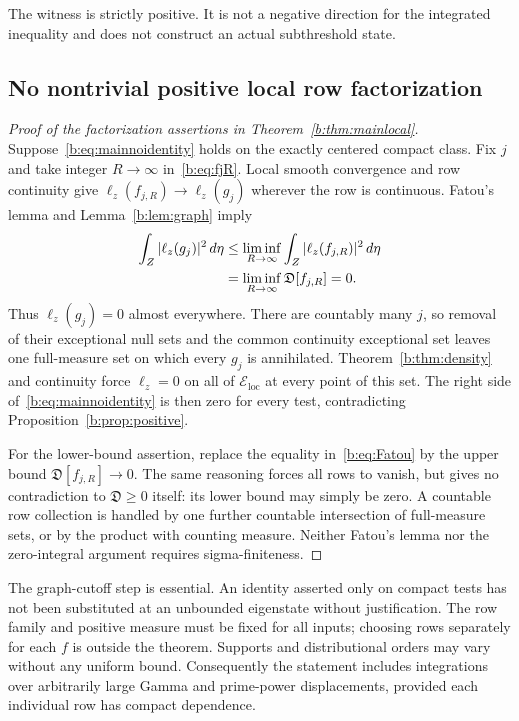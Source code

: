 \documentclass[11pt,a4paper]{article}
\numberwithin{equation}{section}
\theoremstyle{definition}\newtheorem{definition}[theorem]{Definition}
\theoremstyle{remark}\newtheorem{remark}[theorem]{Remark}
\newcommand{\Eloc}{\mathcal E_{\mathrm{loc}}}\newcommand{\Def}{\mathfrak D}
\begin{document}
The witness is strictly positive. It is not a negative direction for the integrated inequality and does not construct an actual subthreshold state.

\subsection{No nontrivial positive local row factorization}\label{b:sec:nogo}

\begin{proof}[Proof of the factorization assertions in Theorem~\ref{b:thm:mainlocal}]
Suppose~\eqref{b:eq:mainnoidentity} holds on the exactly centered compact class. Fix $j$ and take integer $R\to\infty$ in~\eqref{b:eq:fjR}. Local smooth convergence and row continuity give
$\ell_z(f_{j,R})\to\ell_z(g_j)$ wherever the row is continuous. Fatou's lemma and Lemma~\ref{b:lem:graph} imply
\begin{align}\label{b:eq:Fatou}
 \int_Z|\ell_z(g_j)|^2\,d\eta
 &\le\liminf_{R\to\infty}\int_Z|\ell_z(f_{j,R})|^2\,d\eta\notag\\
 &=\liminf_{R\to\infty}\Def[f_{j,R}]=0.
\end{align}
Thus $\ell_z(g_j)=0$ almost everywhere. There are countably many $j$, so removal of their exceptional null sets and the common continuity exceptional set leaves one full-measure set on which every $g_j$ is annihilated. Theorem~\ref{b:thm:density} and continuity force $\ell_z=0$ on all of $\Eloc$ at every point of this set. The right side of~\eqref{b:eq:mainnoidentity} is then zero for every test, contradicting Proposition~\ref{b:prop:positive}.

For the lower-bound assertion, replace the equality in~\eqref{b:eq:Fatou} by the upper bound $\Def[f_{j,R}]\to0$. The same reasoning forces all rows to vanish, but gives no contradiction to $\Def\ge0$ itself: its lower bound may simply be zero. A countable row collection is handled by one further countable intersection of full-measure sets, or by the product with counting measure. Neither Fatou's lemma nor the zero-integral argument requires sigma-finiteness.
\end{proof}

The graph-cutoff step is essential. An identity asserted only on compact tests has not been substituted at an unbounded eigenstate without justification. The row family and positive measure must be fixed for all inputs; choosing rows separately for each $f$ is outside the theorem. Supports and distributional orders may vary without any uniform bound. Consequently the statement includes integrations over arbitrarily large Gamma and prime-power displacements, provided each individual row has compact dependence.
\end{document}
